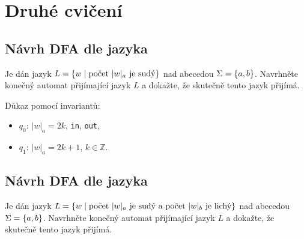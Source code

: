 \section{Druhé cvičení}

\subsection{Návrh DFA dle jazyka}

Je dán jazyk $L = \left\lbrace w \mid \text{počet } |w|_a \text{ je sudý} \right\rbrace$ nad abecedou $\Sigma = \left\lbrace a,b \right\rbrace$. Navrhněte konečný
automat přijímající jazyk $L$ a dokažte, že skutečně tento jazyk přijímá.

\begin{multicols}{2}

    Důkaz pomocí invariantů:
    \begin{itemize}[noitemsep]
        \item $q_0$: $|w|_a = 2k$, \texttt{in}, \texttt{out},
        \item $q_1$: $|w|_a = 2k + 1$, $k \in \mathbb{Z}$.
    \end{itemize}
\end{multicols}

\subsection{Návrh DFA dle jazyka}
Je dán jazyk $L = \left\lbrace w \mid \text{počet } |w|_a \text{ je sudý a počet } |w|_b \text{ je lichý} \right\rbrace$ nad abecedou
$\Sigma = \left\lbrace a,b \right\rbrace$. Navrhněte konečný automat přijímající jazyk $L$ a dokažte, že skutečně tento jazyk přijímá.

